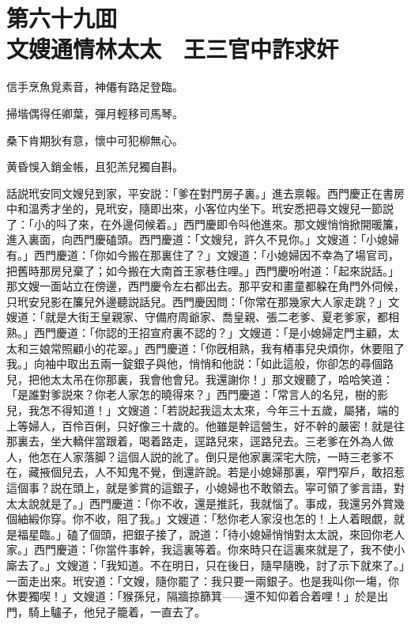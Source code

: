 
\chapter*{第六十九囬　\\文嫂通情林太太　王三官中詐求奸}


\begin{myquote}
信手烹魚覓素音，神僊有路足登臨。

掃堦偶得任卿葉，彈月輕移司馬琴。

桑下肯期狄有意，懷中可犯柳無心。

黄昏悞入銷金帳，且犯羔兒獨自斟。
\end{myquote}

話説玳安同文嫂兒到家，平安説：「爹在對門房子裏。」進去禀報。西門慶正在書房中和溫秀才坐的，見玳安，隨即出來，小客位内坐下。玳安悉把尋文嫂兒一節説了：「小的呌了來，在外邊伺候着。」西門慶即令呌他進來。那文嫂悄悄掀開暖簾，進入裏面，向西門慶磕頭。西門慶道：「文嫂兒，許久不見你。」文嫂道：「小媳婦有。」西門慶道：「你如今搬在那裏住了？」文嫂道：「小媳婦因不幸為了場官司，把舊時那房兒棄了；如今搬在大南首王家巷住哩。」西門慶吩咐道：「起來説話。」那文嫂一面站立在傍邊，西門慶令左右都出去。那平安和畫童都躱在角門外伺候，只玳安兒影在簾兒外邊聽説話兒。西門慶因問：「你常在那幾家大人家走跳？」文嫂道：「就是大街王皇親家、守備府周爺家、喬皇親、張二老爹、夏老爹家，都相熟。」西門慶道：「你認的王招宣府裏不認的？」文嫂道：「是小媳婦定門主顧，太太和三娘常照顧小的花翠。」西門慶道：「你旣相熟，我有樁事兒央煩你，休要阻了我。」向袖中取出五兩一錠銀子與他，悄悄和他説：「如此這般，你卻怎的尋個路兒，把他太太吊在你那裏，我會他會兒。我還謝你！」那文嫂聽了，哈哈笑道：「是誰對爹説來？你老人家怎的曉得來？」西門慶道：「常言人的名兒，樹的影兒，我怎不得知道！」文嫂道：「若説起我這太太來，今年三十五歲，屬猪，端的上等婦人，百伶百俐，只好像三十歲的。他雖是幹這營生，好不幹的嚴密！就是往那裏去，坐大轎伴當跟着，喝着路走，逕路兒來，逕路兒去。三老爹在外為人做人，他怎在人家落脚？這個人説的訛了。倒只是他家裏深宅大院，一時三老爹不在，藏掖個兒去，人不知鬼不覺，倒還許說。若是小媳婦那裏，窄門窄戶，敢招惹這個事？説在頭上，就是爹賞的這銀子，小媳婦也不敢領去。寜可領了爹言語，對太太說就是了。」西門慶道：「你不收，還是推託，我就惱了。事成，我還另外賞幾個紬緞你穿。你不收，阻了我。」文嫂道：「愁你老人家沒也怎的！上人着眼覷，就是福星臨。」磕了個頭，把銀子接了，說道：「待小媳婦悄悄對太太說，來回你老人家。」西門慶道：「你當件事幹，我這裏等着。你來時只在這裏來就是了，我不使小廝去了。」文嫂道：「我知道。不在明日，只在後日，隨早隨晚，討了示下就來了。」一面走出來。玳安道：「文嫂，隨你罷了：我只要一兩銀子。也是我叫你一塲，你休要獨喫！」文嫂道：「猴孫兒，隔牆掠篩箕——還不知仰着合着哩！」於是出門，騎上驢子，他兒子籠着，一直去了。

